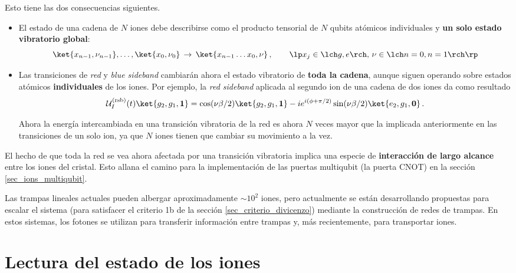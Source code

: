 Esto tiene las dos consecuencias siguientes.
\begin{itemize}
\item El estado de una cadena de $N$ iones debe describirse como el producto tensorial de $N$ qubits atómicos individuales y \textbf{un solo estado vibratorio global}:
	\begin{equation}
	\ket{x_{n-1},\nu_{n-1}}, \dots, \ket{x_0, \nu_0} \, \rightarrow \, \ket{x_{n-1} \dots x_0, \nu}  \,, \qquad \lp x_j \in \lch g,e \rch, \, \nu \in \lch n=0,n=1 \rch \rp
	\end{equation}

\item Las transiciones de \textit{red} y \textit{blue sideband} cambiarán ahora el estado vibratorio de \textbf{toda la cadena}, aunque siguen operando sobre estados atómicos \textbf{individuales} de los iones. Por ejemplo, la \textit{red sideband} aplicada al segundo ion de una cadena de dos iones da como resultado
	\begin{equation}
	\mathcal{U}_I^{\text{(rsb)}}(t) \ket{g_2, g_1, \mathbf{1}} = \cos(\nu\beta/2) \ket{g_2, g_1, \mathbf{1}} - i e^{i (\phi+\pi/2)} \sin(\nu\beta/2) \ket{e_2, g_1, \mathbf{0}} \, .
	\end{equation}

Ahora la energía intercambiada en una transición vibratoria de la red es ahora $N$ veces mayor que la implicada anteriormente en las transiciones de un solo ion, ya que $N$ iones tienen que cambiar su movimiento a la vez.
\end{itemize}

El hecho de que toda la red se vea ahora afectada por una transición vibratoria implica una especie de \textbf{interacción de largo alcance} entre los iones del cristal. Esto allana el camino para la implementación de las puertas multiqubit (la puerta CNOT) en la sección \ref{sec_ions_multiqubit}.

Las trampas lineales actuales pueden albergar aproximadamente $\sim 10^2$ iones, pero actualmente se están desarrollando propuestas para escalar el sistema (para satisfacer el criterio 1b de la sección \ref{sec_criterio_divicenzo}) mediante la construcción de redes de trampas. En estos sistemas, los fotones se utilizan para transferir información entre trampas y, más recientemente, para transportar iones.



\section{Lectura del estado de los iones}

